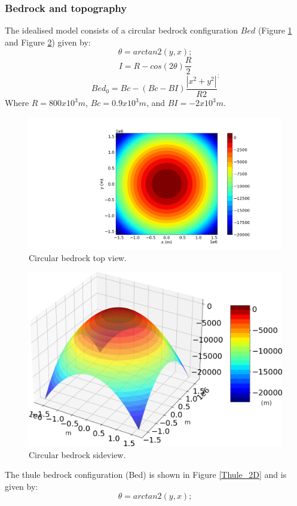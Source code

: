 \documentclass[a4paper,12pt]{article}
\begin{document}
\subsubsection{Bedrock and topography}
The idealised model consists of a circular bedrock configuration $Bed$ (Figure \ref{circular_topo_top} and Figure \ref{circular_topo_jet}) given by:
\begin{equation}
	\theta=arctan2(y,x);
\end{equation}
\begin{equation}
	I=R-cos(2\theta)\frac{R}{2}
\end{equation}
\begin{equation}
	Bed_0=Bc-(Bc-BI)\frac{|x^2+y^2|}{R2}^;
\end{equation}
Where $R=800x10^3 m$, $Bc=0.9 x 10^3 m$, and $BI=-2 x 10^3 m$. 
\begin{figure}[!h]
	\centering
	\includegraphics[width=0.7\linewidth]{../fig/circular_topo_top}
	\caption{Circular bedrock top view.}
	\label{circular_topo_top}
\end{figure}
\begin{figure}[!h]
	\centering
	\includegraphics[width=0.7\linewidth]{../fig/circular_topo_jet}
	\caption{Circular bedrock sideview.}
	\label{circular_topo_jet}
\end{figure}
The thule bedrock configuration (Bed) is shown in Figure \ref{Thule_2D} and is given by:
\begin{equation}
	\theta=arctan2(y,x);
\end{equation}
\end{document}
